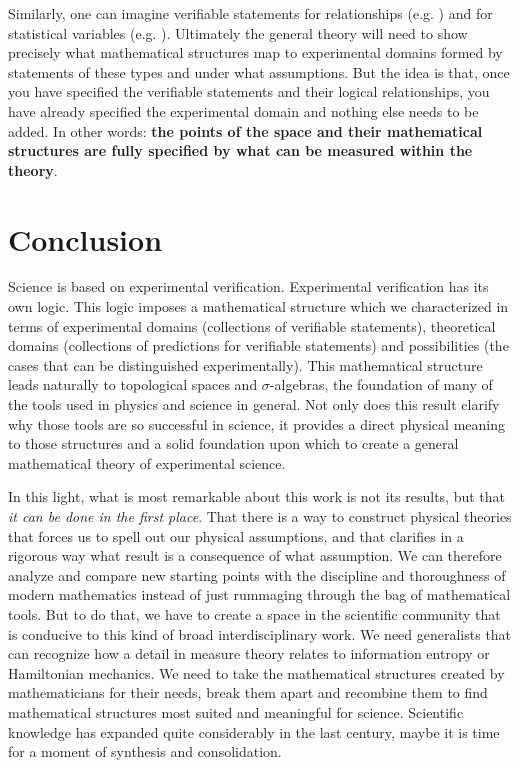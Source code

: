 \documentclass[twocolumn]{article}
\begin{document}
Similarly, one can imagine verifiable statements for relationships (e.g. ) and for statistical variables (e.g. ). Ultimately the general theory will need to show precisely what mathematical structures map to experimental domains formed by statements of these types and under what assumptions. But the idea is that, once you have specified the verifiable statements and their logical relationships, you have already specified the experimental domain and nothing else needs to be added. In other words: \textbf{the points of the space and their mathematical structures are fully specified by what can be measured within the theory}.

\section{Conclusion}

Science is based on experimental verification. Experimental verification has its own logic. This logic imposes a mathematical structure which we characterized in terms of experimental domains (collections of verifiable statements), theoretical domains (collections of predictions for verifiable statements) and possibilities (the cases that can be distinguished experimentally). This mathematical structure leads naturally to topological spaces and $\sigma$-algebras, the foundation of many of the tools used in physics and science in general. Not only does this result clarify why those tools are so successful in science, it provides a direct physical meaning to those structures and a solid foundation upon which to create a general mathematical theory of experimental science.

In this light, what is most remarkable about this work is not its results, but that \emph{it can be done in the first place}. That there is a way to construct physical theories that forces us to spell out our physical assumptions, and that clarifies in a rigorous way what result is a consequence of what assumption. We can therefore analyze and compare new starting points with the discipline and thoroughness of modern mathematics instead of just rummaging through the bag of mathematical tools. But to do that, we have to create a space in the scientific community that is conducive to this kind of broad interdisciplinary work. We need generalists that can recognize how a detail in measure theory relates to information entropy or Hamiltonian mechanics. We need to take the mathematical structures created by mathematicians for their needs, break them apart and recombine them to find mathematical structures most suited and meaningful for science. Scientific knowledge has expanded quite considerably in the last century, maybe it is time for a moment of synthesis and consolidation.
\end{document}
